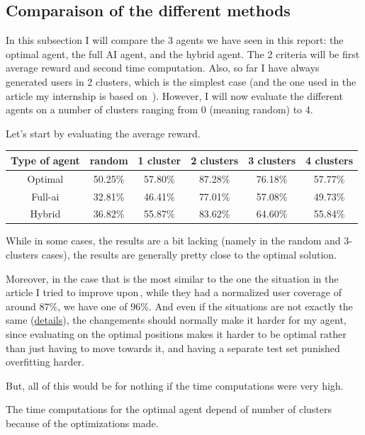 \documentclass[letterpaper]{article}
\begin{document}
\subsection{Comparaison of the different methods}

In this subsection I will compare the 3 agents we have seen in this report: the optimal agent, the full AI agent, and the hybrid agent.
The 2 criteria will be first average reward and second time computation.
Also, so far I have always generated users in 2 clusters, which is the simplest case (and the one used in the article my internship is based on \,\cite{main_article}).
However, I will now evaluate the different agents on a number of clusters ranging from 0 (meaning random) to 4.

Let's start by evaluating the average reward.

\begin{center}
    \begin{tabular}{|c|c|c|c|c|c|}
    \hline 
     Type of agent & random & 1 cluster & 2 clusters & 3 clusters & 4 clusters \\ 
     \hline
     Optimal & 50.25\% & 57.80\% & 87.28\% & 76.18\% & 57.77\% \\  
     \hline
     Full-ai & 32.81\% & 46.41\% & 77.01\% & 57.08\% & 49.73\%  \\
     \hline
     Hybrid &  36.82\% & 55.87\% & 83.62\% & 64.60\% & 55.84\%  \\
     \hline
    \end{tabular}
\end{center}

While in some cases, the results are a bit lacking (namely in the random and 3-clusters cases), the results are generally pretty close to the optimal solution.

Moreover, in the case that is the most similar to the one the situation in the article I tried to improve upon\,\cite{main_article}, while they had a normalized user coverage
of around 87\%, we have one of 96\%. And even if the situations are not exactly the same (\hyperref[reinforcement]{details}), the changements should normally make it harder for my agent,
since evaluating on the optimal positions makes it harder to be optimal rather than just having to move towards it,
and having a separate test set punished overfitting harder.

But, all of this would be for nothing if the time computations were very high.

The time computations for the optimal agent depend of number of clusters because of the optimizations made.
\end{document}
